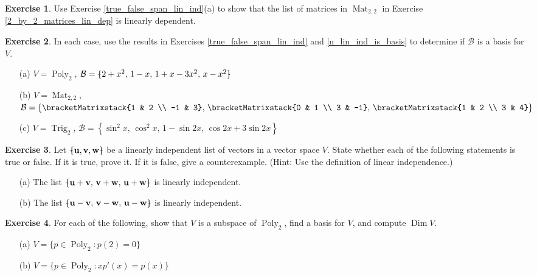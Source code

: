 \documentclass[a4paper,11pt]{book}
\theoremstyle{definition}
\newtheorem{exercise}{Exercise}
\newcommand{\ve}[1]{\mathbf{#1}}
\newcommand{\basis}[1]{{\mathcal #1}}
\newcommand{\cmatrix}[1]{\bracketMatrixstack{#1}}
\newcommand{\bmark}{\raisebox{.53ex}{\rule{.2em}{.1ex}}}
\newcommand{\bopen}{{\protect\ooalign{\{\cr\hfil\bmark\hfil\cr}}}
\newcommand{\bclose}{{\protect\ooalign{\}\cr\hfil\bmark\hfil\cr}}}
\DeclareMathOperator{\Poly}{Poly}
\DeclareMathOperator{\Trig}{Trig}
\DeclareMathOperator{\Mat}{Mat}
\DeclareMathOperator{\Dim}{Dim}
\begin{document}
\begin{exercise} \label{checking_matrices_lin_dep} Use Exercise \ref{true_false_span_lin_ind}(a) to show that the list of matrices in $\Mat_{2,2}$ in Exercise \ref{2_by_2_matrices_lin_dep} is linearly dependent.
\end{exercise}

\begin{exercise} In each case, use the results in Exercises \ref{true_false_span_lin_ind} and \ref{n_lin_ind_is_basis} to determine if $\basis{B}$ is a basis for $V$.
\begin{itemize}
 \item[(a)] $V = \Poly_2$, $\basis{B} = \bopen 2 + x^2, \, 1-x, \, 1 + x - 3x^2, \, x-x^2 \bclose$
 \item[(b)] $V = \Mat_{2,2}$, $\basis{B} = \left\{ \cmatrix{1 & 2 \\ -1 & 3}, \, \cmatrix{0 & 1 \\ 3 & -1}, \, \cmatrix{1 & 2 \\ 3 & 4} \right\}$
 \item[(c)] $V = \Trig_2$, $\basis{B} = \left\{ \sin^2 x, \, \cos^2 x, \, 1 - \sin 2x, \, \cos 2x + 3 \sin 2x  \right\}$
\end{itemize}
\end{exercise}



\begin{exercise} Let $\bopen \ve{u}, \ve{v}, \ve{w} \bclose$ be a linearly independent list of vectors in a vector space $V$. State whether each of the following statements is true or false. If it is true, prove it. If it is false, give a counterexample. (Hint: Use the definition of linear independence.)
\begin{itemize}
 \item[(a)] The list $\bopen \ve{u} + \ve{v}, \, \ve{v} + \ve{w}, \, \ve{u} + \ve{w} \bclose$ is linearly independent.
 \item[(b)] The list $\bopen \ve{u} - \ve{v}, \, \ve{v} - \ve{w}, \, \ve{u} - \ve{w} \bclose$ is linearly independent.
\end{itemize}
\end{exercise}


\begin{exercise} \label{dim_poly_at_2_ex} For each of the following, show that $V$ is a subspace of $\Poly_2$, find a basis for $V$, and compute $\Dim V$.
\begin{itemize}
 \item[(a)] $V = \{ p \in \Poly_2 : p(2) = 0 \}$
 \item[(b)] $V = \{ p \in \Poly_2 : xp'(x) = p(x) \}$
\end{itemize}
\end{exercise}
\end{document}
